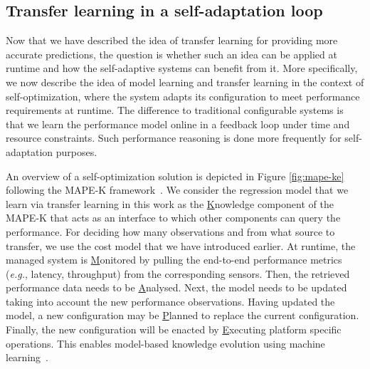 
\subsection{Transfer learning in a self-adaptation loop}

Now that we have described the idea of transfer learning for providing more accurate predictions, the question is whether such an idea can be applied at runtime and how the self-adaptive systems can benefit from it. More specifically, we now describe the idea of model learning and transfer learning in the context of self-optimization, where the system adapts its configuration to meet performance requirements at runtime. The difference to traditional configurable systems is that we learn the performance model online in a feedback loop under time and resource constraints. Such performance reasoning is done more frequently for self-adaptation purposes. %

An overview of a self-optimization solution is depicted in Figure \ref{fig:mape-ke} following the MAPE-K framework~\cite{de2013software,kephart2003vision}. We consider the regression model that we learn via transfer learning in this work as the \underline{K}nowledge component of the MAPE-K that acts as an interface to which other components can query the performance. %
For deciding how many observations and from what source to transfer, we use the cost model that we have introduced earlier. At runtime, the managed system is \underline{M}onitored by pulling the end-to-end performance metrics (\emph{e.g.}, latency, throughput) from the corresponding sensors. Then, the retrieved performance data needs to be \underline{A}nalysed. Next, the model needs to be updated taking into account the new performance observations. Having updated the model, a new configuration may be \underline{P}lanned to replace the current configuration. Finally, the new configuration will be enacted by \underline{E}xecuting platform specific operations. This enables model-based knowledge evolution using machine learning~\cite{jamshidi2016managing}. 

